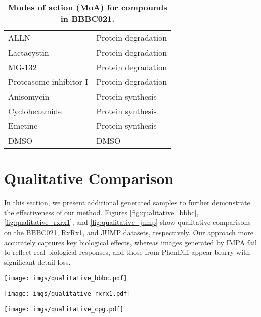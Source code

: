 \begin{table}[htbp]
\begin{tabular}{ll}
        ALLN & Protein degradation \\
        Lactacystin & Protein degradation \\
        MG-132 & Protein degradation \\
        Proteasome inhibitor I & Protein degradation \\
        Anisomycin & Protein synthesis \\
        Cyclohexamide & Protein synthesis \\
        Emetine & Protein synthesis \\
        DMSO & DMSO \\
        \bottomrule
    \end{tabular}
    \caption{\textbf{Modes of action (MoA) for compounds in BBBC021.}}
    \label{tab:moa}
\end{table}


\newpage
\section{Qualitative Comparison}
\label{sec:comparison}

In this section, we present additional generated samples to further demonstrate the effectiveness of our method. Figures \ref{fig:qualitative_bbbc}, \ref{fig:qualitative_rxrx1}, and \ref{fig:qualitative_jump} show qualitative comparisons on the BBBC021, RxRx1, and JUMP datasets, respectively. Our approach more accurately captures key biological effects, whereas images generated by IMPA fail to reflect real biological responses, and those from PhenDiff appear blurry with significant detail loss.

\begin{figure*}[htbp]
    \centering
    \texttt{[image: imgs/qualitative\_bbbc.pdf]}
    \caption{\textbf{More qualitative comparisons of generated samples on BBBC021.}  }
    \label{fig:qualitative_bbbc}
\end{figure*}
\begin{figure*}[htbp]
    \centering
    \texttt{[image: imgs/qualitative\_rxrx1.pdf]}
    \caption{\textbf{More qualitative comparisons of generated samples on RxRx1.}  }
    \label{fig:qualitative_rxrx1}
\end{figure*}
\begin{figure*}[htbp]
    \centering
    \texttt{[image: imgs/qualitative\_cpg.pdf]}
    \caption{\textbf{More qualitative comparisons of generated samples on JUMP.}  }
    \label{fig:qualitative_jump}
\end{figure*}


